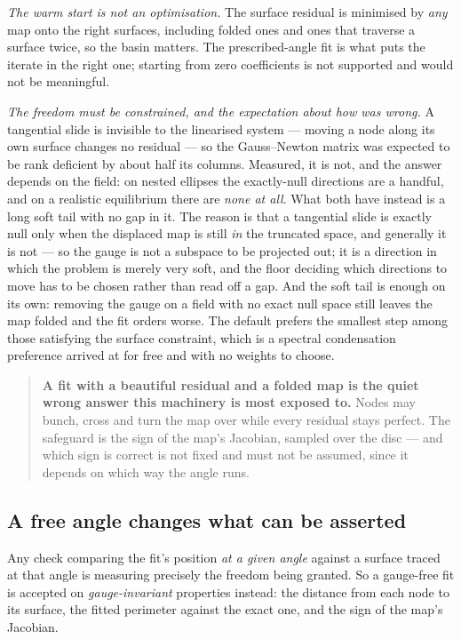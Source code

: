 \emph{The warm start is not an optimisation.} The surface residual is minimised
by \emph{any} map onto the right surfaces, including folded ones and ones that
traverse a surface twice, so the basin matters. The prescribed-angle fit is what
puts the iterate in the right one; starting from zero coefficients is not
supported and would not be meaningful.

\emph{The freedom must be constrained, and the expectation about how was wrong.}
A tangential slide is invisible to the linearised system --- moving a node along
its own surface changes no residual --- so the Gauss--Newton matrix was expected
to be rank deficient by about half its columns. Measured, it is not, and the
answer depends on the field: on nested ellipses the exactly-null directions are a
handful, and on a realistic equilibrium there are \emph{none at all}. What both
have instead is a long soft tail with no gap in it. The reason is that a
tangential slide is exactly null only when the displaced map is still \emph{in}
the truncated space, and generally it is not --- so the gauge is not a subspace
to be projected out; it is a direction in which the problem is merely very soft,
and the floor deciding which directions to move has to be chosen rather than read
off a gap. And the soft tail is enough on its own: removing the gauge on a field
with no exact null space still leaves the map folded and the fit orders worse.
The default prefers the smallest step among those satisfying the surface
constraint, which is a spectral condensation preference \cite{HirshmanBreslau1998}
arrived at for free and with no weights to choose.

\begin{quote}
	\textbf{A fit with a beautiful residual and a folded map is the quiet wrong
	answer this machinery is most exposed to.} Nodes may bunch, cross and turn
	the map over while every residual stays perfect. The safeguard is the sign of
	the map's Jacobian, sampled over the disc --- and which sign is correct is not
	fixed and must not be assumed, since it depends on which way the angle runs.
\end{quote}

\subsection{A free angle changes what can be asserted}

Any check comparing the fit's position \emph{at a given angle} against a surface
traced at that angle is measuring precisely the freedom being granted. So a
gauge-free fit is accepted on \emph{gauge-invariant} properties instead: the
distance from each node to its surface, the fitted perimeter against the exact
one, and the sign of the map's Jacobian.

